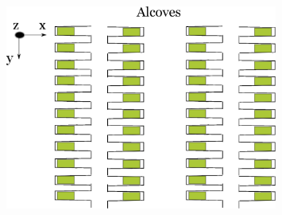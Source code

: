\begin{frame}
\begin{minipage}{0.49\textwidth}
\begin{figure}[h!]
    \end{figure}
    \begin{figure}[h!]
      \includegraphics[width=0.8\textwidth]{./images/alcoves.eps}
    \end{figure}
  \end{minipage}

\end{frame}
